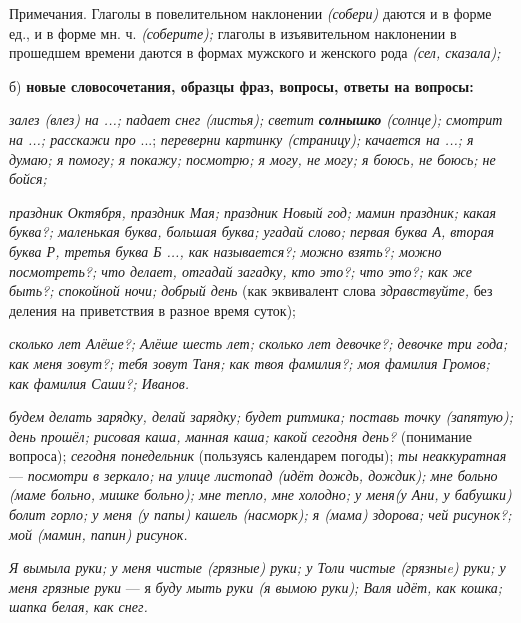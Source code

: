 \documentclass[a5paper]{book}
\renewcommand{\emph}[1]{\textit{#1}}
\begin{document}
Примечания. Глаголы в повелительном наклонении \emph{(собери)} даются и
в форме ед., и в форме мн. ч. \emph{(соберите);} глаголы в изъявительном
наклонении в прошедшем времени даются в формах мужского и женского рода
\emph{(сел, сказала);}

б) \textbf{новые словосочетания, образцы фраз, вопросы, ответы на
вопросы:}

\emph{залез (влез) на ...; падает снег (листья); светит
\textbf{солнышко} (солнце); смотрит на ...; расскажи про} ...;
\emph{переверни картинку (страницу); качается на ...; я думаю; я помогу;
я покажу; посмотрю; я могу, не могу; я боюсь, не боюсь; не бойся;}

\emph{праздник Октября, праздник Мая; праздник Новый год; мамин
праздник; какая буква?; маленькая буква, большая буква; угадай слово;
первая буква А, вторая буква Р, третья буква Б ..., как называется?;
можно взять?; можно посмотреть?; что делает, отгадай загадку, кто это?;
что это?; как же быть?; спокойной ночи; добрый день} (как эквивалент
слова \emph{здравствуйте,} без деления на приветствия в разное время
суток);

\emph{сколько лет Алёше?; Алёше шесть лет; сколько лет девочке?; девочке
три года; как меня зовут?; тебя зовут Таня; как твоя фамилия?; моя
фамилия Громов; как фамилия Саши?; Иванов.}

\emph{будем делать зарядку, делай зарядку; будет ритмика; поставь точку
(запятую); день прошёл; рисовая каша, манная каша; какой сегодня день?}
(понимание вопроса); \emph{сегодня понедельник} (пользуясь календарем
погоды); \emph{ты неаккуратная} --- \emph{посмотри в зеркало; на улице
листопад (идёт дождь, дождик); мне больно (маме больно, мишке больно);
мне тепло, мне холодно; у меня(у Ани, у бабушки) болит горло; у меня (у
папы) кашель (насморк); я (мама) здорова; чей рисунок?; мой (мамин,
папин) рисунок.}

\emph{Я вымыла руки; у меня чистые (грязные) руки; у Толи чистые
(грязныe) руки; у меня грязные руки} --- я \emph{буду мыть руки (я вымою
руки); Валя идёт, как кошка; шапка белая, как снег.}
\end{document}

